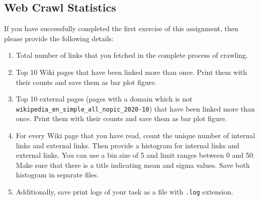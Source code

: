\documentclass{resources/WeSTassignment}
\begin{document}
\subsection{Web Crawl Statistics\label{web_crawl_stats}}

If you have successfully completed the first exercise of this assignment, then please provide the following details:

\begin{enumerate}
\item Total number of links that you fetched in the complete process of crawling.
\item Top 10 Wiki pages that have been linked more than once. Print them with their counts and save them as bar plot figure.
\item Top 10 external pages (pages with a domain which is not \texttt{wikipedia\_en\_simple\_all\_nopic\_2020-10}) that have been linked more than once. Print them with their counts and save them as bar plot figure.
\item For every Wiki page that you have read, count the unique number of internal links and external links. Then provide a histogram for internal links and external links. You can use a bin size of 5 and limit ranges between 0 and 50. Make sure that there is a title indicating mean and sigma values. Save both histogram in separate files.
\item Additionally, save print logs of your task as a file with \texttt{.log} extension.
\end{enumerate}
\end{document}
